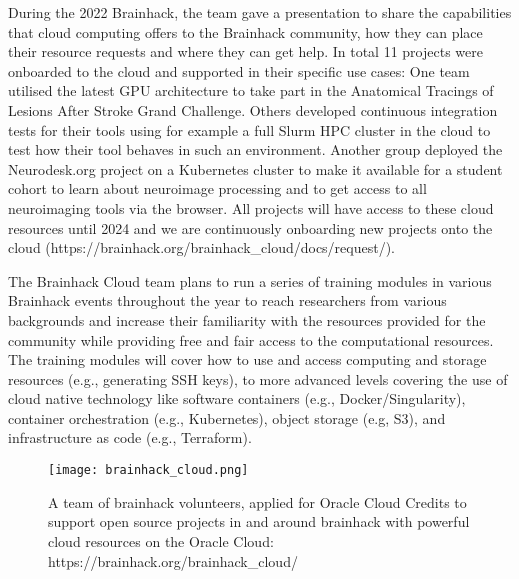 \documentclass[../main.tex]{subfiles}
\begin{document}
During the 2022 Brainhack, the team gave a presentation to share the capabilities that cloud computing offers to the Brainhack community, how they can place their resource requests and where they can get help. In total 11 projects were onboarded to the cloud and supported in their specific use cases: One team utilised the latest GPU architecture to take part in the Anatomical Tracings of Lesions After Stroke Grand Challenge. Others developed continuous integration tests for their tools using for example a full Slurm HPC cluster in the cloud to test how their tool behaves in such an environment. Another group deployed the Neurodesk.org \parencite{NeuroDesk} project on a Kubernetes cluster to make it available for a student cohort to learn about neuroimage processing and to get access to all neuroimaging tools via the browser. All projects will have access to these cloud resources until 2024 and we are continuously onboarding new projects onto the cloud (https://brainhack.org/brainhack\_cloud/docs/request/).

The Brainhack Cloud team plans to run a series of training modules in various Brainhack events throughout the year to reach researchers from various backgrounds and increase their familiarity with the resources provided for the community while providing free and fair access to the computational resources. The training modules will cover how to use and access computing and storage resources (e.g., generating SSH keys), to more advanced levels covering the use of cloud native technology like software containers (e.g., Docker/Singularity), container orchestration (e.g., Kubernetes), object storage (e.g, S3), and infrastructure as code (e.g., Terraform).

\begin{figure}
    \centering
    \texttt{[image: brainhack\_cloud.png]}
    \caption{A team of brainhack volunteers, applied for Oracle Cloud Credits to support open source projects in and around brainhack with powerful cloud resources on the Oracle Cloud: https://brainhack.org/brainhack\_cloud/
    }
    \label{fig:cloud}
\end{figure}


\end{document}
